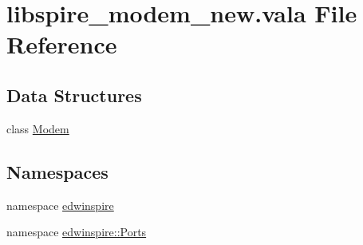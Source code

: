 \hypertarget{libspire__modem__new_8vala}{\section{libspire\-\_\-modem\-\_\-new.\-vala File Reference}
\label{libspire__modem__new_8vala}
}
\subsection*{Data Structures}
\begin{DoxyCompactItemize}
\item 
class \hyperlink{classedwinspire_1_1_ports_1_1_modem}{Modem}
\end{DoxyCompactItemize}
\subsection*{Namespaces}
\begin{DoxyCompactItemize}
\item 
namespace \hyperlink{namespaceedwinspire}{edwinspire}
\item 
namespace \hyperlink{namespaceedwinspire_1_1_ports}{edwinspire\-::\-Ports}
\end{DoxyCompactItemize}

